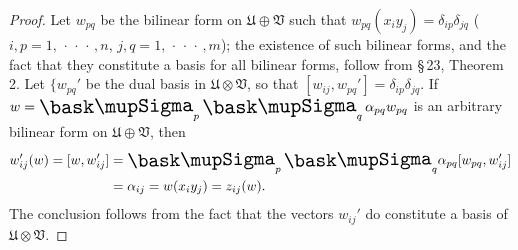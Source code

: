 \begin{proof}
    Let \(w_{pq}\) be the bilinear form on \(\mathfrak{U} \oplus \mathfrak{V}\)
    such that \(w_{pq}(x_i y_j) = \delta_{ip}\delta_{jq}\) (\(i, p = 1,
    \,\cdot\,\cdot\,\cdot\,, n\), \(j, q = 1, \,\cdot\,\cdot\,\cdot\,, m\)); the
    existence of such bilinear forms, and the fact that they constitute a basis
    for all bilinear forms, follow from \S\,23, Theorem 2. Let \(\{w_{pq}'\) be
    the dual basis in \(\mathfrak{U} \otimes \mathfrak{V}\), so that \([w_{ij},
    w_{pq}'] = \delta_{ip}\delta_{jq}\). If \(w = \sumx_p \sumx_q \alpha_{pq}
    w_{pq}\) is an arbitrary bilinear form on \(\mathfrak{U} \oplus
    \mathfrak{V}\), then
    \begin{align*}
        w_{ij}'(w) = [w, w_{ij}'] &= {\textstyle\sumx_p \sumx_q} \alpha_{pq} [w_{pq}, w_{ij}'] \\
        &= \alpha_{ij} = w(x_i y_j) = z_{ij}(w).
    \end{align*}
    The conclusion follows from the fact that the vectors \(w_{ij}'\) do constitute a basis of \(\mathfrak{U} \otimes \mathfrak{V}\).
\end{proof}


